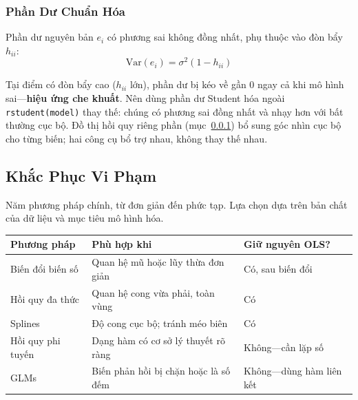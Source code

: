 \documentclass[12pt, a4paper]{article}
\begin{document}
\subsubsection{Phần Dư Chuẩn Hóa}
\label{sec:partial_reg}

Phần dư nguyên bản $e_i$ có phương sai không đồng nhất, phụ thuộc vào đòn bẩy $h_{ii}$:
\[
  \mathrm{Var}(e_i) = \sigma^2(1 - h_{ii})
\]

Tại điểm có đòn bẩy cao ($h_{ii}$ lớn), phần dư bị kéo về gần $0$ ngay cả khi mô hình sai---\textbf{hiệu ứng che khuất}. Nên dùng phần dư Student hóa ngoài \texttt{rstudent(model)} thay thế: chúng có phương sai đồng nhất và nhạy hơn với bất thường cục bộ. Đồ thị hồi quy riêng phần (mục~\ref{sec:partial_reg}) bổ sung góc nhìn cục bộ cho từng biến; hai công cụ bổ trợ nhau, không thay thế nhau.

\subsection{Khắc Phục Vi Phạm}

Năm phương pháp chính, từ đơn giản đến phức tạp. Lựa chọn dựa trên bản chất của dữ liệu và mục tiêu mô hình hóa.

\begin{center}
\begin{tabular}{@{}lp{5.2cm}l@{}}
\toprule
\textbf{Phương pháp} & \textbf{Phù hợp khi} & \textbf{Giữ nguyên OLS?} \\
\midrule
Biến đổi biến số    & Quan hệ mũ hoặc lũy thừa đơn giản         & Có, sau biến đổi \\
Hồi quy đa thức     & Quan hệ cong vừa phải, toàn vùng           & Có \\
Splines             & Độ cong cục bộ; tránh méo biên              & Có \\
Hồi quy phi tuyến  & Dạng hàm có cơ sở lý thuyết rõ ràng        & Không---cần lặp số \\
GLMs                & Biến phản hồi bị chặn hoặc là số đếm       & Không---dùng hàm liên kết \\
\bottomrule
\end{tabular}
\end{center}

\end{document}
